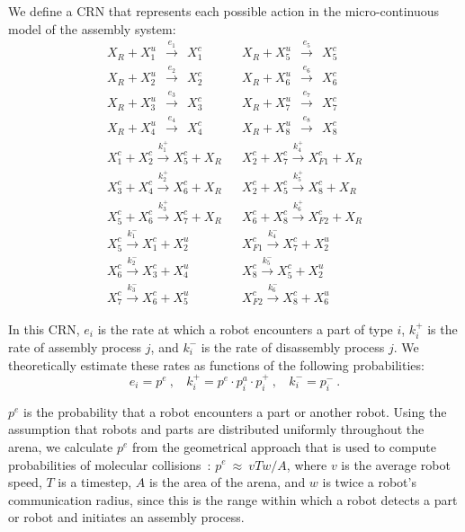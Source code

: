 We define a CRN that represents each possible action in the
micro-continuous model of the assembly system:
\begin{eqnarray}
X_R + X_1^u ~~\xrightarrow{e_1} ~~ X_1^c &  & X_R + X_5^u ~~\xrightarrow{e_5} ~~ X_5^c \nonumber \\
X_R + X_2^u ~~\xrightarrow{e_2} ~~ X_2^c &  & X_R + X_6^u ~~\xrightarrow{e_6} ~~ X_6^c \nonumber \\
X_R + X_3^u ~~\xrightarrow{e_3} ~~ X_3^c &  & X_R + X_7^u ~~\xrightarrow{e_7} ~~ X_7^c \nonumber \\
X_R + X_4^u ~~\xrightarrow{e_4} ~~ X_4^c &  & X_R + X_8^u ~~\xrightarrow{e_8} ~~ X_8^c \nonumber \\
X_1^c + X_2^c \xrightarrow{k_1^+} X_5^c + X_R &  &  X_2^c + X_7^c \xrightarrow{k_4^+} X_{F1}^c + X_R \nonumber \\
X_3^c + X_4^c \xrightarrow{k_2^+} X_6^c + X_R & & X_2^c + X_5^c \xrightarrow{k_5^+} X_{8}^c + X_R \nonumber \\
X_5^c + X_6^c \xrightarrow{k_3^+} X_7^c + X_R & & X_6^c + X_8^c \xrightarrow{k_6^+} X_{F2}^c + X_R \nonumber \\
X_5^c \xrightarrow{k_1^-} X_1^c + X_2^u &  &  X_{F1}^c \xrightarrow{k_4^-} X_{7}^c + X_2^u \nonumber \\
X_6^c \xrightarrow{k_2^-} X_3^c + X_4^u & & X_8^c \xrightarrow{k_5^-} X_{5}^c + X_2^u\nonumber \\
X_7^c \xrightarrow{k_3^-} X_6^c + X_5^u & & X_{F2}^c
\xrightarrow{k_6^-} X_{8}^c + X_6^u
\label{eq:complete_macro_continous}
\end{eqnarray}

In this CRN, $e_i$ is the rate at which a robot encounters a part of
type $i$, $k_i^+$ is the rate of assembly process $j$, and $k_i^-$
is the rate of disassembly process $j$.  We theoretically estimate
these rates as functions of the following probabilities:
\begin{equation}
e_i = p^e~, ~~~~k_i^+ = p^e \cdot p^a_i \cdot p_i^+~, ~~~~k_i^- =
p_i^-~. \label{eq:rateDef}
\end{equation}

$p^e$ is the probability that a robot encounters a part or another
robot.  Using the assumption that robots and parts are distributed
uniformly throughout the arena, we calculate $p^e$ from the
geometrical approach that is used to compute probabilities of
molecular collisions~\cite{Gillespie:1992p8126, Correll:2006p8328}:
$p^e~\approx~v T w / A$, where $v$ is the average robot speed, $T$
is a timestep, $A$ is the area of the arena, and $w$ is twice a
robot's communication radius, since this is the range within which a
robot detects a part or robot and initiates an assembly process.

